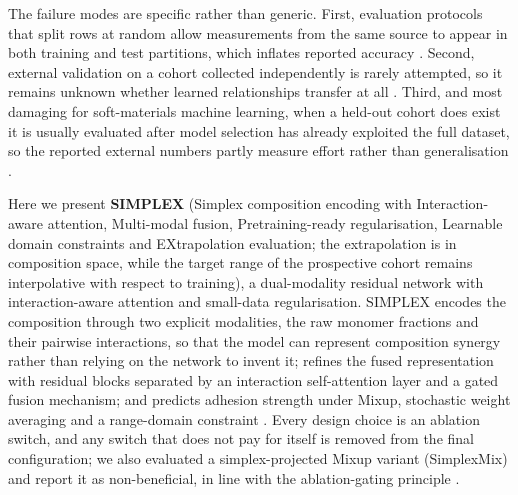 \documentclass[utf8]{FrontiersinHarvard}
\begin{document}
The failure modes are specific rather than generic. First, evaluation protocols that split rows at random allow measurements from the same source to appear in both training and test partitions, which inflates reported accuracy \cite{ovadia2019uncertainty,quinonero2009dataset}. Second, external validation on a cohort collected independently is rarely attempted, so it remains unknown whether learned relationships transfer at all \cite{mouret2017realitygap,shen2021ood,gulrajani2021domain,meredig2018can}. Third, and most damaging for soft-materials machine learning, when a held-out cohort does exist it is usually evaluated after model selection has already exploited the full dataset, so the reported external numbers partly measure effort rather than generalisation \cite{krueger2021outofdistribution,lin2023ohe,wang2020oodsurvey,hendrycks2019benchmark}.

Here we present \textbf{SIMPLEX} (Simplex composition encoding with Interaction-aware attention, Multi-modal fusion, Pretraining-ready regularisation, Learnable domain constraints and EXtrapolation evaluation; the extrapolation is in composition space, while the target range of the prospective cohort remains interpolative with respect to training), a dual-modality residual network with interaction-aware attention and small-data regularisation. SIMPLEX encodes the composition through two explicit modalities, the raw monomer fractions and their pairwise interactions, so that the model can represent composition synergy rather than relying on the network to invent it; refines the fused representation with residual blocks separated by an interaction self-attention layer and a gated fusion mechanism; and predicts adhesion strength under Mixup, stochastic weight averaging and a range-domain constraint \cite{he2016resnet,kingma2015adam,loshchilov2019adamw,smith2019onecycle,hornik1989mlp,vaswani2017attention,perez2018film,foret2021sam,srivastava2014dropout,ioffe2015batchnorm,hendrycks2016gelu,yun2020transformers,shahriari2016bayesian,chu2020smooth,chen2022activelearning,snelson2006gp,settles2009al,recent2021karniadaki,recent2022cuomo,recent2023pyun,recent2025xue,recent2024wang}. Every design choice is an ablation switch, and any switch that does not pay for itself is removed from the final configuration; we also evaluated a simplex-projected Mixup variant (SimplexMix) and report it as non-beneficial, in line with the ablation-gating principle \cite{egozcue2003clr,cole2020design,wang2023hydrogelML,pawlowsky2015modeling}.
\end{document}
